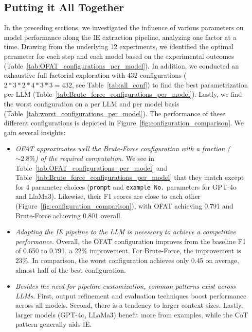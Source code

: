 \subsection{Putting it All Together}

In the preceding sections, we investigated the influence of various parameters on model performance along the IE extraction pipeline, analyzing one factor at a time. Drawing from the underlying 12 experiments, we identified the optimal parameter for each step and each model based on the experimental outcomes (Table~\ref{tab:OFAT_configurations_per_model}). In addition, we conducted an exhaustive full factorial exploration with 432 configurations ($2*3*2*4*3*3=432$, see Table~\ref{tab:all_conf}) to find the best parametrization per LLM (Table~\ref{tab:Brute_force_configurations_per_model}). Lastly, we find the worst configuration on a per LLM and per model basis (Table~\ref{tab:worst_configurations_per_model}).
The performance of these different configurations is depicted in Figure~\ref{fig:configuration_comparison}.
We gain several insights:

\begin{itemize}[leftmargin=*,noitemsep,topsep=0pt]

\item \emph{OFAT approximates well the Brute-Force configuration with a fraction ($\sim2.8\%$) of the required computation.} We see in Table~\ref{tab:OFAT_configurations_per_model} and Table~\ref{tab:Brute_force_configurations_per_model} that they match except for 4 parameter choices (\texttt{prompt} and \texttt{example No.} parameters for GPT-4o and LlaMa3). Likewise, their F1 scores are close to each other (Figure~\ref{fig:configuration_comparison}), with OFAT achieving 0.791 and Brute-Force achieving 0.801 overall.


\item \emph{Adapting the IE pipeline to the LLM is necessary to achieve a competitive performance.} 
Overall, the OFAT configuration improves from the baseline F1 of 0.650 to 0.791, a $22\%$ improvement. For Brute-Force, the improvement is $23\%$. In comparison, the worst configuration achieves only 0.45 on average, almost half of the best configuration.

\item \emph{Besides the need for pipeline customization, common patterns exist across LLMs.} First, output refinement and evaluation techniques boost performance across all models. Second, there is a tendency to larger context sizes. Lastly, larger models (GPT-4o, LLaMa3) benefit more from examples, while the CoT pattern generally aids IE.

\end{itemize}

